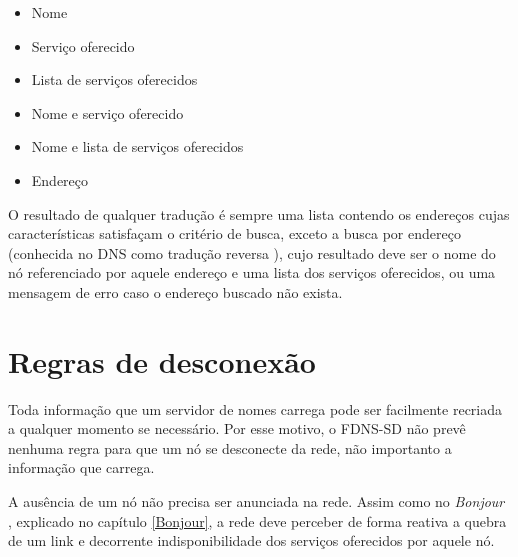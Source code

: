     \begin{itemize}
        \item Nome
        \item Serviço oferecido
        \item Lista de serviços oferecidos
        \item Nome e serviço oferecido
        \item Nome e lista de serviços oferecidos
        \item Endereço
    \end{itemize}
    
    O resultado de qualquer tradução é sempre uma lista contendo os endereços
    cujas características satisfaçam o critério de busca, exceto a busca por endereço
    (conhecida no DNS como tradução reversa \cite{rfc1035}), cujo resultado deve
    ser o nome do nó referenciado por aquele endereço e uma lista dos serviços
    oferecidos, ou uma mensagem de erro caso o endereço buscado não exista.
    
\section{Regras de desconexão}
    Toda informação que um servidor de nomes carrega pode ser facilmente recriada
    a qualquer momento se necessário. Por esse motivo, o FDNS-SD não prevê nenhuma
    regra para que um nó se desconecte da rede, não importanto a informação que
    carrega.
    
    A ausência de um nó não precisa ser anunciada na rede. Assim como no
    \textit{Bonjour} \cite{mdns}, explicado no capítulo \ref{Bonjour}, a rede
    deve perceber de forma reativa a quebra de um link e decorrente indisponibilidade
    dos serviços oferecidos por aquele nó.